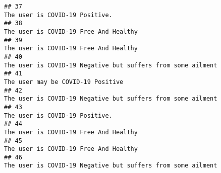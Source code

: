 \documentclass[
]{article}
\begin{document}
\begin{verbatim}
## 37                                                                                                                                                                                                                                      The user is COVID-19 Positive.
## 38                                                                                                                                                                                                                               The user is COVID-19 Free And Healthy
## 39                                                                                                                                                                                                                               The user is COVID-19 Free And Healthy
## 40                                                                                                                                                                                                         The user is COVID-19 Negative but suffers from some ailment
## 41                                                                                                                                                                                                                                   The user may be COVID-19 Positive
## 42                                                                                                                                                                                                         The user is COVID-19 Negative but suffers from some ailment
## 43                                                                                                                                                                                                                                      The user is COVID-19 Positive.
## 44                                                                                                                                                                                                                               The user is COVID-19 Free And Healthy
## 45                                                                                                                                                                                                                               The user is COVID-19 Free And Healthy
## 46                                                                                                                                                                                                         The user is COVID-19 Negative but suffers from some ailment

\end{verbatim}
\end{document}
